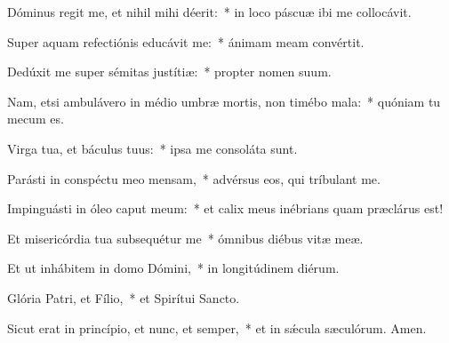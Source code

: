 \item Dóminus regit me, et nihil mihi déerit:~* in loco páscuæ ibi me collocávit.

\item Super aquam refectiónis educávit me:~* ánimam meam convértit.

\item Dedúxit me super sémitas justítiæ:~* propter nomen suum.

\item Nam, etsi ambulávero in médio umbræ mortis, non timébo mala:~* quóniam tu mecum es.

\item Virga tua, et báculus tuus:~* ipsa me consoláta sunt.

\item Parásti in conspéctu meo mensam,~* advérsus eos, qui tríbulant me.

\item Impinguásti in óleo caput meum:~* et calix meus inébrians quam præclárus est!

\item Et misericórdia tua subsequétur me~* ómnibus diébus vitæ meæ.

\item Et ut inhábitem in domo Dómini,~* in longitúdinem diérum.

\item Glória Patri, et Fílio,~* et Spirítui Sancto.

\item Sicut erat in princípio, et nunc, et semper,~* et in sǽcula sæculórum. Amen.

